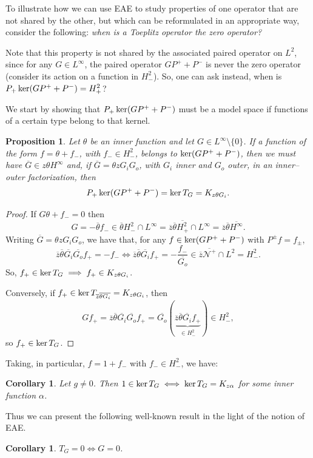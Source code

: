 \documentclass[11pt]{article}
\newtheorem{cor}[thm]{Corollary}
\newtheorem{prop}[thm]{Proposition}
\def\GN{\mathcal N}
\def\ol{\overline}
\def\ker{\mathop{\rm ker}\nolimits}
\begin{document}
To illustrate how we can use EAE to study properties of one operator that are not shared by 
the other, but which can be reformulated in an appropriate way, consider the following:
{\em when is a Toeplitz operator the zero operator?}

Note that
this property is not shared by the associated paired operator on $L^2$, since
for any $G \in L^\infty$,
the paired operator $GP^+ + P^-$ is never the zero operator (consider its action on 
a function in $H^2_-$). So, one can ask instead, when is
$P_+ \ker (GP^+ + P^-) = H^2_+$?

We start by showing that $P_+ \ker (GP^+ + P^-)$ must be a model space if functions of
a certain type belong to that kernel.

\begin{prop}\label{prop:2.2jul30}
Let $\theta$ be an inner function and let $G \in L^\infty\setminus\{0\}$.
If a function of the form $f=\theta+f_-$, with $f_- \in H^2_-$, belongs to 
$\ker (GP^+ + P^-)$, then we must have $\ol G \in z\theta H^\infty$ and,
if $\ol G = \theta z G_i G_o$, with $G_i$ inner
and $G_o$ outer, in an inner--outer factorization, then
\[
P_+ \ker (GP^+ + P^-) = \ker T_G = K_{z\theta G_i}.
\]
\end{prop}
\begin{proof}
If $G\theta + f_-=0$ then 
\[
G=-\ol\theta f_- \in  \ol\theta H^2_-\cap L^\infty  = \ol z\ol\theta \ol{H^2_+} \cap L^\infty = \ol z\ol\theta \ol{H^\infty}.
\]
Writing $\ol G=\theta z G_i G_o$, we have that, for any $f \in \ker (GP^+ + P^-)$ with $P^\pm f = f_\pm$,
\[
\ol z\ol \theta \ol{G_i} \ol{G_o} f_+=-f_- \iff \ol z\ol\theta \ol{G_i} f_+=- \frac{f_-}{\ol{G_o}} \in \ol z \ol{\GN^+} \cap L^2= H^2_-.
\]
So, $f_+ \in \ker T_G \implies f_+ \in K_{z\theta G_i}$.

Conversely, if $f_+ \in \ker T_{\ol z \ol\theta \ol{G_i}}= K_{z\theta G_i}$, then
\[
Gf_+ = \ol z \ol\theta \ol{G_i} \ol{G_o} f_+ = \ol{G_o} (\underbrace{\ol z\ol\theta \ol{G_i} f_+}_{\in H^2_-}) \in H^2_-,
\]
so $f_+ \in \ker T_G$.
\end{proof}

Taking, in particular, $f=1+f_-$ with $f_- \in H^2_-$, we have:
\begin{cor}
Let $g \ne 0$. Then $1 \in \ker T_G \iff \ker T_G = K_{z\alpha}$ for some inner function $\alpha$. 
\end{cor}
Thus we can present the following well-known result in the light of the notion of EAE.
\begin{cor}
$T_G=0 \iff G=0$.
\end{cor}
\end{document}
